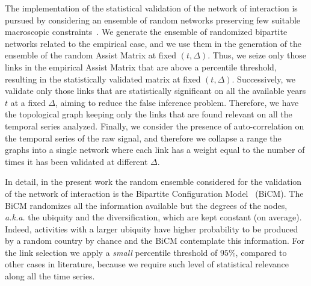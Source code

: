 \documentclass[fleqn,10pt]{article}
\begin{document}
The implementation of the statistical validation of the network of interaction is pursued by considering an ensemble of random networks preserving few suitable macroscopic constraints~\cite{Saracco2017}. 
We generate the ensemble of randomized bipartite networks related to the empirical case, and we use them in the generation of the ensemble of the random Assist Matrix at fixed $(t,\Delta)$. 
Thus, we seize only those links in the empirical Assist Matrix that are above a percentile threshold, resulting in the statistically validated matrix at fixed $(t,\Delta)$.
Successively, we validate only those links that are statistically significant on all the available years $t$ at a fixed $\Delta$, aiming to reduce the false inference problem.
Therefore, we have the topological graph keeping only the links that are found relevant on all the temporal series analyzed.
Finally, we consider the presence of auto-correlation on the temporal series of the raw signal, and therefore we collapse a range the graphs into a single network where each link has a weight equal to the number of times it has been validated at different $\Delta$.


In detail, in the present work the random ensemble considered for the validation of the network of interaction is the Bipartite Configuration Model~\cite{Squartini2011,Saracco2015} (BiCM).
The BiCM randomizes all the information available but the degrees of the nodes, \textit{a.k.a.} the ubiquity and the diversification, which are kept constant (on average).
Indeed, activities with a larger ubiquity have higher probability to be produced by a random country by chance and the BiCM contemplate this information.
For the link selection we apply a \textit{small} percentile threshold of $95\%$, compared to other cases in literature, because we require such level of statistical relevance along all the time series.
\end{document}
